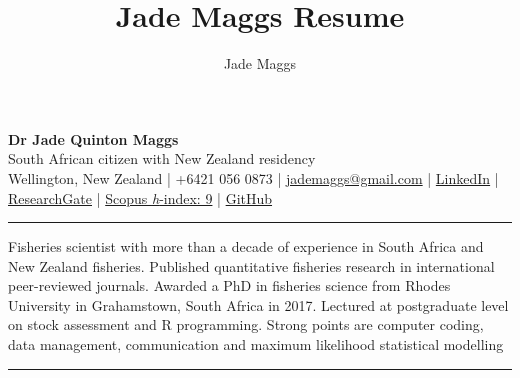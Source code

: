 \documentclass[10pt,a4paper]{article}
\author{Jade Maggs}
\title{Jade Maggs Resume}
\begin{document}
	
\noindent
{\Large \textbf{Dr Jade Quinton Maggs}}\\
South African citizen with New Zealand residency\\
{\small Wellington, New Zealand | +6421 056 0873 | \href{mailto:jademaggs@gmail.com}{jademaggs@gmail.com} |
\href{http://www.linkedin.com/pub/jade-maggs/29/917/5a0}{LinkedIn} |
			\href{https://www.researchgate.net/profile/Jade_Maggs}{ResearchGate} | 
			\href{https://www.scopus.com/authid/detail.uri?authorId=55250227800}{Scopus \textit{h}-index: 9} |
			\href{https://github.com/jademaggs?tab=repositories}{GitHub}}\\
\hrule
\vspace{6pt}
\noindent
Fisheries scientist with more than a decade of experience in South Africa and New Zealand fisheries. Published quantitative fisheries research in international peer-reviewed journals. Awarded a PhD in fisheries science from Rhodes University in Grahamstown, South Africa in 2017. Lectured at postgraduate level on stock assessment and R programming. Strong points are computer coding, data management, communication and maximum likelihood statistical modelling\\
\hrule
\vspace{6pt}
\noindent

\end{document}
